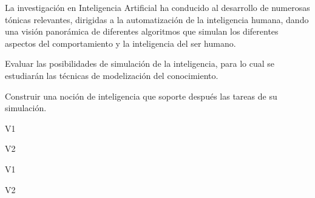 \begin{syllabus}


\begin{justification}
La investigación en Inteligencia Artificial ha conducido al desarrollo de
numerosas tónicas relevantes, dirigidas a la automatización de la
inteligencia humana, dando una visión panorámica de diferentes
algoritmos que simulan los diferentes aspectos del comportamiento
y la inteligencia del ser humano.
\end{justification}

\begin{goals}
    \item Evaluar las posibilidades de simulación de la inteligencia, para lo cual se estudiarán las técnicas de modelización del conocimiento.
    \item Construir una noción de inteligencia que soporte después las tareas de su simulación.
\end{goals}

\begin{outcomes}{V1}
    \item {}
    \item {}
\end{outcomes}

\begin{outcomes}{V2}
    \item {}
    \item {}
\end{outcomes}

\begin{competences}{V1}
    \item {} 
    \item {}
    \item {}
\end{competences}

\begin{competences}{V2}
    \item {} 
    \item {}
    \item {}
\end{competences}


\end{syllabus}
